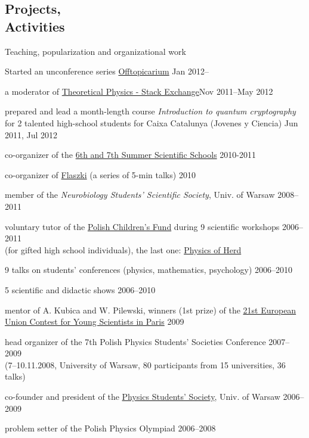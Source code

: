 \documentclass[margin,line]{resume}
\begin{document}
\begin{resume}
    \section{\mysidestyle Projects,\\Activities}
    Teaching, popularization and organizational work
        \begin{list2}
        \item Started an unconference series \href{http://offtopicarium.wikidot.com/en:start}{Offtopicarium} \hfill { Jan 2012--}
	    \item a moderator of \href{http://theoreticalphysics.stackexchange.com/}{Theoretical Physics - Stack Exchange}\hfill Nov 2011--May 2012
        \item prepared and lead a month-length course {\sl Introduction to quantum cryptography} for 2 talented high-school students for Caixa Catalunya (Jovenes y Ciencia) \hfill Jun 2011, Jul 2012
        \item co-organizer of the \href{http://warsztatywww.wikidot.com/en}{6th and 7th  Summer Scientific Schools} \hfill 2010-2011%
        \item co-organizer of \href{http://www.flaszki.waw.pl/}{Flaszki} (a series of 5-min talks) \hfill 2010
        \item member of the {\sl Neurobiology Students' Scientific Society}, Univ. of Warsaw  \hfill 2008--2011
        \item voluntary tutor of the \href{http://www.fundusz.org/?lang=gb}{Polish Children's Fund} during 9 scientific workshops \hfill 2006--2011\\
        (for gifted high school individuals), the last one: \href{http://migdal.wikidot.com/fizyka-stada}{Physics of Herd}
        \item 9 talks on students' conferences (physics, mathematics, psychology) \hfill 2006--2010
        \item 5 scientific and didactic shows \hfill 2006--2010
        \item mentor of A. Kubica and W. Pilewski, winners (1st prize) of the \href{http://www.eucys09.fr/}{21st European Union Contest for Young Scientists in Paris}  \hfill 2009
        \item head organizer of the 7th Polish Physics Students' Societies Conference \hfill 2007--2009\\
        (7--10.11.2008, University of Warsaw, 80 participants from 15 universities, 36 talks)
        \item co-founder and president of the \href{http://skfiz.fuw.edu.pl/en}{Physics Students' Society}, Univ. of Warsaw \hfill 2006--2009
         \item problem setter of the Polish Physics Olympiad \hfill 2006--2008
        \end{list2} 
	

\end{resume}
\end{document}
